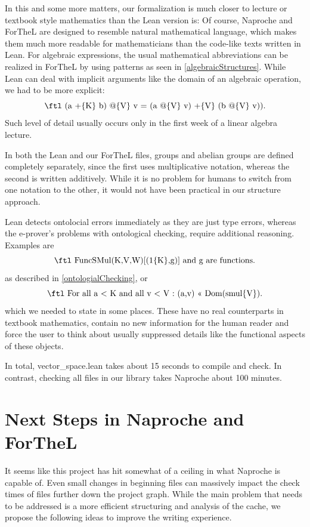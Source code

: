 \documentclass[11pt]{article}
\begin{document}
In this and some more matters, our formalization is much closer to lecture or textbook style mathematics than the Lean version is:
Of course, Naproche and ForTheL are designed to resemble natural mathematical language, which makes them much more readable for mathematicians than the code-like texts written in Lean. For algebraic expressions, the usual mathematical abbreviations can be realized in ForTheL by using patterns as seen in \ref{algebraicStructures}.
While Lean can deal with implicit arguments like the domain of an algebraic operation, we had to be more explicit:
$$\text{\ftl (a +\{K\} b) @\{V\} v = (a @\{V\} v) +\{V\} (b @\{V\} v)).}$$
Such level of detail usually occurs only in the first week of a linear algebra lecture.

In both the Lean and our ForTheL files, groups and abelian groups are defined completely separately, since the first uses multiplicative notation, whereas the second is written additively.
While it is no problem for humans to switch from one notation to the other, it would not have been practical in our {\ftl structure} approach.

Lean detects ontolocial errors immediately as they are just type errors, whereas the e-prover's problems with ontological checking, require additional reasoning. Examples are
$$\text{\ftl FuncSMul(K,V,W)[(1\{K\},g)] and g are functions.}$$
as described in \ref{ontologialChecking}, or
$$\text{\ftl For all a < K and all v < V : (a,v) << Dom(smul\{V\}).}$$
which we needed to state in some places.
These have no real counterparts in textbook mathematics, contain no new information for the human reader and force the user to think about usually suppressed details like the functional aspects of these objects.

In total, vector\_space.lean takes about 15 seconds to compile and check. In contrast, checking all files in our library takes Naproche about 100 minutes.


\newpage 
\section{Next Steps in Naproche and ForTheL}\label{nextsteps}
It seems like this project has hit somewhat of a ceiling in what Naproche is capable of. 
Even small changes in beginning files can massively impact the check times of files further down the project graph.
While the main problem that needs to be addressed is a more efficient structuring and analysis of the cache, we propose the following ideas to improve the writing experience.
\end{document}
